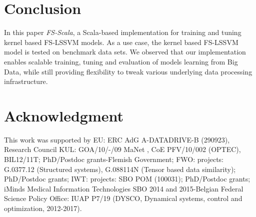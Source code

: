 \documentclass[conference, cmex10]{IEEEtran}
\begin{document}
\section{Conclusion} \label{Conclusion}

In this paper \textit{FS-Scala}, a Scala-based implementation for training and tuning kernel based FS-LSSVM models. As a use case, the kernel based FS-LSSVM model is tested on benchmark data sets. We observed that our implementation enables scalable training, tuning and evaluation of models learning from Big Data, while still providing flexibility to tweak various underlying data processing infrastructure.




%


\appendices
\section*{Acknowledgment}
This work was supported by EU: ERC AdG A-DATADRIVE-B (290923), Research Council KUL: GOA/10/-/09 MaNet , CoE PFV/10/002 (OPTEC), BIL12/11T; PhD/Postdoc grants-Flemish Government; FWO: projects: G.0377.12 (Structured systems), G.088114N (Tensor based data similarity); PhD/Postdoc grants; IWT: projects: SBO POM (100031); PhD/Postdoc grants; iMinds Medical Information Technologies SBO 2014 and 2015-Belgian Federal Science Policy Office: IUAP P7/19 (DYSCO, Dynamical systems, control and optimization, 2012-2017).
\end{document}
